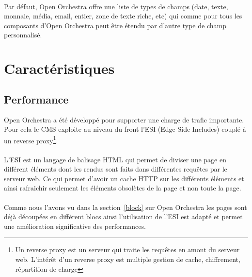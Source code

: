           \paragraph{}
          Par défaut, Open Orchestra offre une liste de types de champs (date, texte, monnaie, média, email, entier, zone de texte riche, etc) qui comme pour tous les composants d'Open Orchestra peut être étendu par d'autre type de champ personnalisé. 
\section{Caractéristiques}
   \subsection{Performance}
   Open Orchestra a été développé pour supporter une charge de trafic importante. Pour cela le CMS exploite au niveau du front l'ESI (Edge Side Includes) couplé à un reverse proxy\footnote{Un reverse proxy est un serveur qui traite les requêtes en amont du serveur web. L'intérêt d'un reverse proxy est multiple gestion de cache, chiffrement, répartition de charge}.
   \paragraph{}
   L'ESI est un langage de balisage HTML qui permet de diviser une page en différent éléments dont les rendus sont faits dans différentes requêtes par le serveur web. Ce qui permet d'avoir un cache HTTP sur les différents éléments et ainsi rafraichir seulement les éléments obsolètes de la page et non toute la page.
   \paragraph{}
   Comme nous l'avons vu dans la section~\ref{block} sur Open Orchestra les pages sont déjà découpées en différent blocs ainsi l'utilisation de l'ESI est adapté et permet une amélioration significative des performances.
